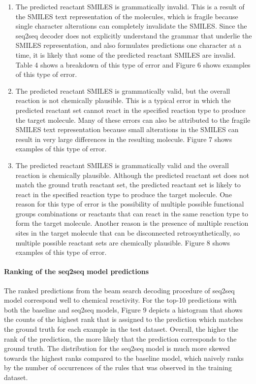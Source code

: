 \begin{enumerate}
    \item The predicted reactant SMILES is grammatically invalid. This is a result of the SMILES text representation of the molecules, which is fragile because single character alterations can completely invalidate the SMILES. Since the seq2seq decoder does not explicitly understand the grammar that underlie the SMILES representation, and also formulates predictions one character at a time, it is likely that some of the predicted reactant SMILES are invalid. Table 4 shows a breakdown of this type of error and Figure 6 shows examples of this type of error.
    \item The predicted reactant SMILES is grammatically valid, but the overall reaction is not chemically plausible. This is a typical error in which the predicted reactant set cannot react in the specified reaction type to produce the target molecule. Many of these errors can also be attributed to the fragile SMILES text representation because small alterations in the SMILES can result in very large differences in the resulting molecule. Figure 7 shows examples of this type of error.
    \item The predicted reactant SMILES is grammatically valid and the overall reaction is chemically plausible. Although the predicted reactant set does not match the ground truth reactant set, the predicted reactant set is likely to react in the specified reaction type to produce the target molecule. One reason for this type of error is the possibility of multiple possible functional groups combinations or reactants that can react in the same reaction type to form the target molecule. Another reason is the presence of multiple reaction sites in the target molecule that can be disconnected retrosynthetically, so multiple possible reactant sets are chemically plausible. Figure 8 shows examples of this type of error.
\end{enumerate}

\paragraph{Ranking of the seq2seq model predictions}

The ranked predictions from the beam search decoding procedure of seq2seq model correspond well to chemical reactivity. For the top-10 predictions with both the baseline and seq2seq models, Figure 9 depicts a histogram that shows the counts of the highest rank that is assigned to the prediction which matches the ground truth for each example in the test dataset. Overall, the higher the rank of the prediction, the more likely that the prediction corresponds to the ground truth. The distribution for the seq2seq model is much more skewed towards the highest ranks compared to the baseline model, which naively ranks by the number of occurrences of the rules that was observed in the training dataset. 


